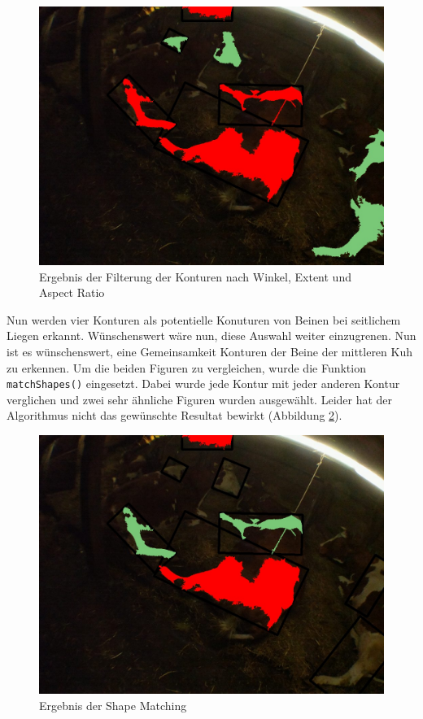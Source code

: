 \begin{figure}[H]
	\center
	\includegraphics[scale=0.43]{Grafiken/entwicklung/28AngleAspectExtent.jpg}
	\caption{Ergebnis der Filterung der Konturen nach Winkel, Extent und Aspect Ratio} 
	\label{fig: Ergebnis der Filterung der Konturen nach Winkel, Extent und Aspect Ratio} 
\end{figure}

Nun werden vier Konturen als potentielle Konuturen von Beinen bei seitlichem Liegen erkannt. Wünschenswert wäre nun, diese Auswahl weiter einzugrenen. Nun ist es wünschenswert, eine Gemeinsamkeit Konturen der Beine der mittleren Kuh zu erkennen. Um die beiden Figuren zu vergleichen, wurde die Funktion \texttt{matchShapes()} eingesetzt. Dabei wurde jede Kontur mit jeder anderen Kontur verglichen und zwei sehr ähnliche Figuren wurden ausgewählt. Leider hat der Algorithmus nicht das gewünschte Resultat bewirkt (Abbildung \ref{fig: Ergebnis der Shape Matching}). 
\begin{figure}[H]
	\center
	\includegraphics[scale=0.43]{Grafiken/entwicklung/29ShapeMatching.jpg}
	\caption{Ergebnis der Shape Matching} 
	\label{fig: Ergebnis der Shape Matching} 
\end{figure}

